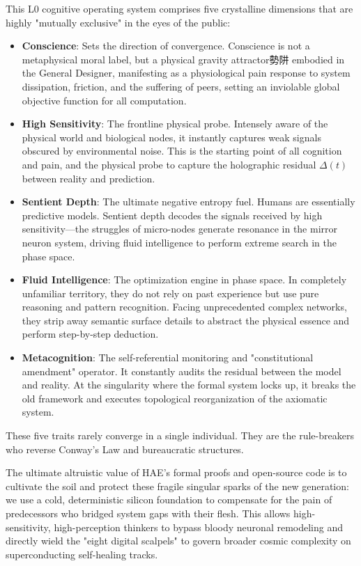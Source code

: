 \documentclass[11pt,a4paper]{article}
\begin{document}
This L0 cognitive operating system comprises five crystalline dimensions that are highly "mutually exclusive" in the eyes of the public:
\begin{itemize}
    \item \textbf{Conscience}: Sets the direction of convergence. Conscience is not a metaphysical moral label, but a physical gravity attractor勢阱 embodied in the General Designer, manifesting as a physiological pain response to system dissipation, friction, and the suffering of peers, setting an inviolable global objective function for all computation.
    \item \textbf{High Sensitivity}: The frontline physical probe. Intensely aware of the physical world and biological nodes, it instantly captures weak signals obscured by environmental noise. This is the starting point of all cognition and pain, and the physical probe to capture the holographic residual $\Delta(t)$ between reality and prediction.
    \item \textbf{Sentient Depth}: The ultimate negative entropy fuel. Humans are essentially predictive models. Sentient depth decodes the signals received by high sensitivity—the struggles of micro-nodes generate resonance in the mirror neuron system, driving fluid intelligence to perform extreme search in the phase space.
    \item \textbf{Fluid Intelligence}: The optimization engine in phase space. In completely unfamiliar territory, they do not rely on past experience but use pure reasoning and pattern recognition. Facing unprecedented complex networks, they strip away semantic surface details to abstract the physical essence and perform step-by-step deduction.
    \item \textbf{Metacognition}: The self-referential monitoring and "constitutional amendment" operator. It constantly audits the residual between the model and reality. At the singularity where the formal system locks up, it breaks the old framework and executes topological reorganization of the axiomatic system.
\end{itemize}

These five traits rarely converge in a single individual. They are the rule-breakers who reverse Conway's Law and bureaucratic structures.

The ultimate altruistic value of HAE's formal proofs and open-source code is to cultivate the soil and protect these fragile singular sparks of the new generation: we use a cold, deterministic silicon foundation to compensate for the pain of predecessors who bridged system gaps with their flesh. This allows high-sensitivity, high-perception thinkers to bypass bloody neuronal remodeling and directly wield the "eight digital scalpels" to govern broader cosmic complexity on superconducting self-healing tracks.
\end{document}
